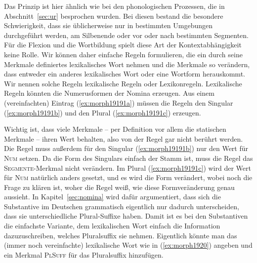 Das Prinzip ist hier ähnlich wie bei den phonologischen Prozessen, die in Abschnitt~\ref{sec:ur} besprochen wurden.
Bei diesen bestand die besondere Schwierigkeit, dass sie üblicherweise nur in bestimmten Umgebungen durchgeführt werden, \zB am Silbenende oder vor oder nach bestimmten Segmenten.
Für die Flexion und die Wortbildung spielt diese Art der Kontextabhängigkeit keine Rolle.
Wir können daher einfache Regeln formulieren, die ein durch seine Merkmale definiertes lexikalisches Wort nehmen und die Merkmale so verändern, dass entweder ein anderes lexikalisches Wort oder eine Wortform herauskommt.
Wir nennen solche Regeln lexikalische Regeln oder Lexikonregeln.
Lexikalische Regeln könnten \zB die Numerusformen der Nomina erzeugen.
Aus einem (vereinfachten) Eintrag (\ref{ex:morph19191a}) müssen die Regeln den Singular (\ref{ex:morph19191b}) und den Plural (\ref{ex:morph19191c}) erzeugen.

\begin{exe}
  \ex\label{ex:morph19191}
  \begin{xlist}
  \end{xlist}
\end{exe}

Wichtig ist, dass viele Merkmale -- per Definition vor allem die statischen Merkmale -- ihren Wert behalten, also von der Regel gar nicht berührt werden.
Die Regel muss außerdem für den Singular (\ref{ex:morph19191b}) nur den Wert für \textsc{Num} setzen.
Da die Form des Singulars einfach der Stamm ist, muss die Regel das \textsc{Segmente}-Merkmal nicht verändern.
Im Plural (\ref{ex:morph19191c}) wird der Wert für \textsc{Num} natürlich anders gesetzt, und es wird die Form verändert, wobei noch die Frage zu klären ist, woher die Regel weiß, wie diese Formveränderung genau aussieht.
In Kapitel~\ref{sec:nomina} wird dafür argumentiert, dass sich die Substantive im Deutschen grammatisch eigentlich nur dadurch unterscheiden, dass sie unterschiedliche Plural-Suffixe haben.
Damit ist es bei den Substantiven die einfachste Variante, dem lexikalischen Wort einfach die Information dazuzuschreiben, welches Pluralsuffix sie nehmen.
Eigentlich könnte man das (immer noch vereinfachte) lexikalische Wort wie in (\ref{ex:morph1920}) angeben und ein Merkmal \textsc{PlSuff} für das Pluralsuffix hinzufügen.

